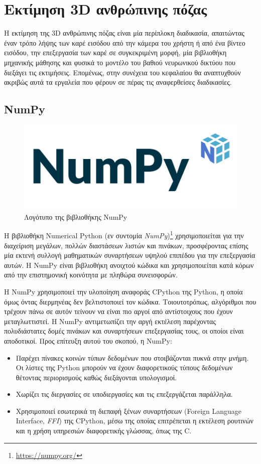 
\section{Εκτίμηση 3D ανθρώπινης πόζας}
\label{section:human_pose_estimation}

Η εκτίμηση της 3D ανθρώπινης πόζας είναι μία περίπλοκη διαδικασία, απαιτώντας έναν τρόπο λήψης των καρέ εισόδου από την κάμερα του χρήστη ή από ένα βίντεο εισόδου, την επεξεργασία των καρέ σε συγκεκριμένη μορφή, μία βιβλιοθήκη μηχανικής μάθησης και φυσικά το μοντέλο του βαθιού νευρωνικού δικτύου που διεξάγει τις εκτιμήσεις. Επομένως, στην συνέχεια του κεφαλαίου θα αναπτυχθούν ακριβώς αυτά τα εργαλεία που φέρουν σε πέρας τις αναφερθείσες διαδικασίες.

\subsection{NumPy}
\begin{figure}[h]
	\centering
	\includegraphics[scale=0.4]{images/chapter3/numpy_logo.png}
	\caption{Λογότυπο της βιβλιοθήκης NumPy }
\end{figure}
Η βιβλιοθήκη Numerical Python (εν συντομία \textsl{NumPy})\footnote{\href{https://numpy.org/}{https://numpy.org/}} χρησιμοποιείται για την διαχείριση μεγάλων, πολλών διαστάσεων λιστών και πινάκων, προσφέροντας επίσης μία εκτενή συλλογή μαθηματικών συναρτήσεων υψηλού επιπέδου για την επεξεργασία αυτών. Η NumPy είναι βιβλιοθήκη ανοιχτού κώδικα και χρησιμοποιείται κατά κόρων από την επιστημονική κοινότητα με πληθώρα συνεισφορών.

Η NumPy χρησιμοποιεί την υλοποίηση αναφοράς CPython της Python, η οποία όμως όντας διερμηνέας δεν βελτιστοποιεί τον κώδικα. Τοιουτοτρόπως, αλγόριθμοι που τρέχουν πάνω σε αυτόν τείνουν να είναι πιο αργοί από αντίστοιχους που έχουν μεταγλωττιστεί. Η NumPy αντιμετωπίζει την αργή εκτέλεση παρέχοντας πολυδιάστατες δομές πινάκων και συναρτήσεων επεξεργασίας τους, οι οποίοι είναι αποδοτικοί. Προς επίτευξη αυτού του σκοπού, η NumPy:

\begin{itemize}
	\item Παρέχει πίνακες κοινών τύπων δεδομένων που στοιβάζονται πυκνά στην μνήμη. Οι λίστες της Python μπορούν να έχουν διαφορετικούς τύπους δεδομένων θέτοντας περιορισμούς καθώς διεξάγονται υπολογισμοί.
	\item Χωρίζει τις διεργασίες σε υποδιεργασίες και τις επεξεργάζεται παράλληλα.
	\item Χρησιμοποιεί εσωτερικά τη διεπαφή ξένων συναρτήσεων (Foreign Language Interface, \textsl{FFI}) της CPython, μέσω της οποίας επιτρέπεται η εκτέλεση ρουτινών και η χρήση υπηρεσιών διαφορετικής γλώσσας, όπως της C.
\end{itemize}


